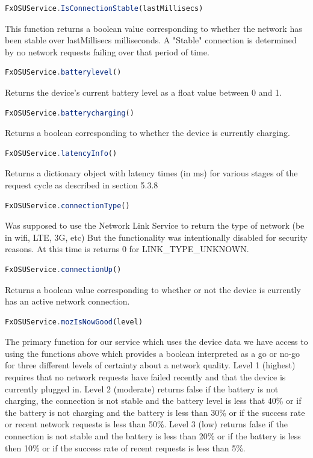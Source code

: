 \documentclass[12pt]{article}
\begin{document}
\begin{itemize}
\begin{lstlisting}[language=JavaScript]
FxOSUService.IsConnectionStable(lastMillisecs)
\end{lstlisting}
This function returns a boolean value corresponding to whether the network has been stable over lastMillisecs milliseconds. A "Stable" connection is determined by no network requests failing over that period of time.  
\begin{lstlisting}[language=JavaScript]
FxOSUService.batterylevel()
\end{lstlisting}
Returns the device's current battery level as a float value between 0 and 1.  
\begin{lstlisting}[language=JavaScript]
FxOSUService.batterycharging()
\end{lstlisting}
Returns a boolean corresponding to whether the device is currently charging.  
\begin{lstlisting}[language=JavaScript]
FxOSUService.latencyInfo()
\end{lstlisting}
Returns a dictionary object with latency times (in ms) for various stages of the request cycle as described in section 5.3.8
\begin{lstlisting}[language=JavaScript]
FxOSUService.connectionType()
\end{lstlisting}  
Was supposed to use the Network Link Service to return the type of network (be in wifi, LTE, 3G, etc) But the functionality was intentionally disabled for security reasons.  At this time is returns 0 for LINK\_TYPE\_UNKNOWN. 
\begin{lstlisting}[language=JavaScript]
FxOSUService.connectionUp()
\end{lstlisting}
Returns a boolean value corresponding to whether or not the device is currently has an active network connection. 
\begin{lstlisting}[language=JavaScript]
FxOSUService.mozIsNowGood(level)
\end{lstlisting}
The primary function for our service which uses the device data we have access to using the functions above which provides a boolean interpreted as a go or no-go for three different levels of certainty about a network quality. Level 1 (highest) requires that no network requests have failed recently and that the device is currently plugged in.  Level 2 (moderate) returns false if the battery is not charging, the connection is not stable and the battery level is less that 40\% or if the battery is not charging and the battery is less than 30\% or if the success rate or recent network requests is less than 50\%. Level 3 (low) returns false if the connection is not stable and the battery is less than 20\% or if the battery is less then 10\% or if the success rate of recent requests is less than 5\%.
\end{itemize}
\pagebreak
\end{document}
